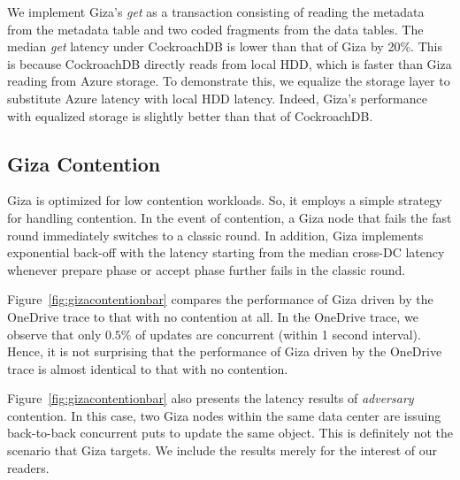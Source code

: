 We implement Giza's {\em get} as a transaction consisting of reading the
metadata from the metadata table and two coded fragments from the data tables.
The median {\em get} latency under CockroachDB is lower than that of Giza by
20\%. This is because CockroachDB directly reads from local HDD,
which is faster than Giza reading from Azure storage. To demonstrate this, we
equalize the storage layer to substitute Azure latency with local HDD latency.
Indeed, Giza's performance with equalized storage is slightly better than that
of CockroachDB. 

%

\subsection{Giza Contention}

Giza is optimized for low contention workloads. So, it employs a simple strategy for handling contention. In the event of contention, a Giza node that fails the fast round immediately switches to a classic round. In addition, Giza implements exponential back-off with the latency starting from the median cross-DC latency whenever prepare phase or accept phase further fails in the classic round.

Figure~\ref{fig:gizacontentionbar} compares the performance of Giza driven by the OneDrive trace to that with no contention at all. In the OneDrive trace, we observe that only $0.5\%$ of updates are concurrent (within 1 second interval). Hence, it is not surprising that the performance of Giza driven by the OneDrive trace is almost identical to that with no contention.

Figure~\ref{fig:gizacontentionbar} also presents the latency results of {\em adversary} contention. In this case, two Giza nodes within the same data center are issuing back-to-back concurrent puts to update the same object. This is definitely not the scenario that Giza targets. We include the results merely for the interest of our readers.


